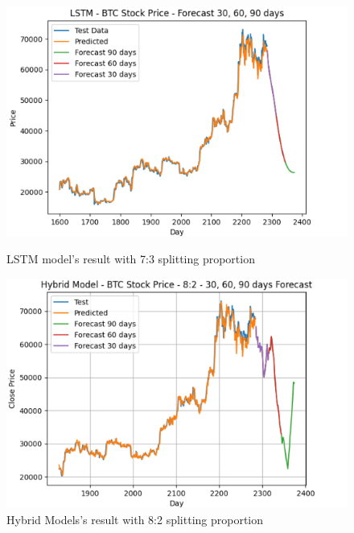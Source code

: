 \documentclass{ieeeojies}
\begin{document}
\begin{figure}[H]
    \centering
    \begin{minipage}{0.23\textwidth}
    \centering
    \includegraphics[width=1\textwidth]{bibliography/Figure/PREDICT/LSTM/LSTM-7-3-BTC.png}
    \caption{LSTM model's result with 7:3 splitting proportion}
    \label{fig10}
    \end{minipage}
    \hfill
    \begin{minipage}{0.23\textwidth}
    \centering
    \includegraphics[width=1\textwidth]{bibliography/Figure/PREDICT/HYBRID MODELS/HB-8-2-BTC.png}
    \caption{Hybrid Models's result with 8:2 splitting proportion}
    \label{fig11}
    \end{minipage}
\end{figure}
\end{document}
